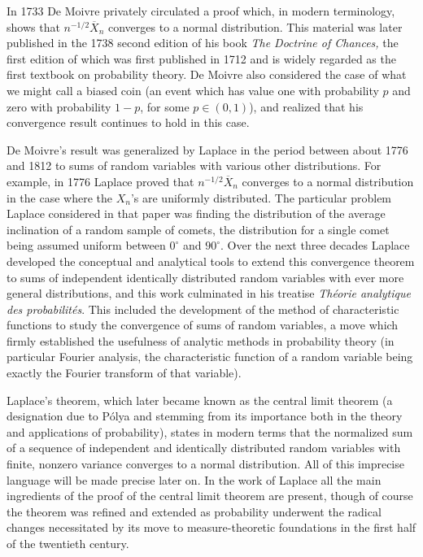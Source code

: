 \documentclass[leqno]{article}
\theoremstyle{definition}
\begin{document}
In 1733 De Moivre privately circulated a proof which, in modern terminology, shows that $n^{-1/2} \overline X_n$ converges to a normal distribution. This material was later published in the 1738 second edition of his book {\em The Doctrine of Chances,} the first edition of which was first published in 1712 and is widely regarded as the first textbook on probability theory. De Moivre also considered the case of what we might call a biased coin (an event which has value one with probability $p$ and zero with probability $1-p$, for some $p \in (0,1)$), and realized that his convergence result continues to hold in this case.

De Moivre's result was generalized by Laplace in the period between about 1776 and 1812 to sums of random variables with various other distributions. For example, in 1776 Laplace proved that $n^{-1/2} \overline X_n$ converges to a normal distribution in the case where the $X_n$'s are uniformly distributed. The particular problem Laplace considered in that paper was finding the distribution of the average inclination of a random sample of comets, the distribution for a single comet being assumed uniform between $0^\circ$ and $90^\circ$. Over the next three decades Laplace developed the conceptual and analytical tools to extend this convergence theorem to sums of independent identically distributed random variables with ever more general distributions, and this work culminated in his treatise {\em Th\'eorie analytique des probabilit\'es}. This included the development of the method of characteristic functions to study the convergence of sums of random variables, a move which firmly established the usefulness of analytic methods in probability theory (in particular Fourier analysis, the characteristic function of a random variable being exactly the Fourier transform of that variable).

Laplace's theorem, which later became known as the central limit theorem (a designation due to P\'olya and stemming from its importance both in the theory and applications of probability), states in modern terms that the normalized sum of a sequence of independent and identically distributed random variables with finite, nonzero variance converges to a normal distribution. All of this imprecise language will be made precise later on. In the work of Laplace all the main ingredients of the proof of the central limit theorem are present, though of course the theorem was refined and extended as probability underwent the radical changes necessitated by its move to measure-theoretic foundations in the first half of the twentieth century.
\end{document}
